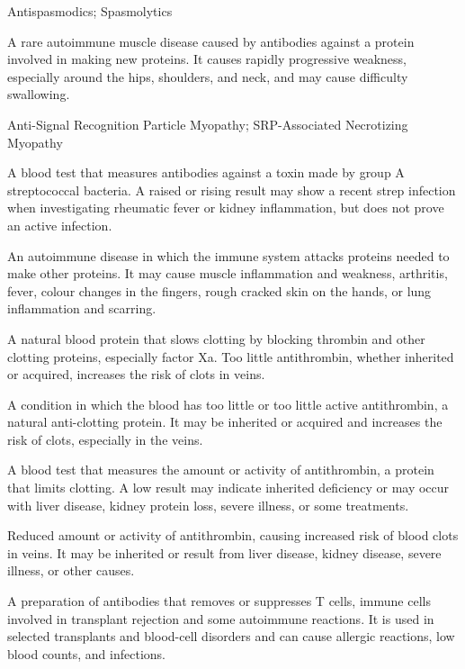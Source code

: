 \synonyms
Antispasmodics; Spasmolytics

 A rare autoimmune muscle disease caused by antibodies against a protein involved in making new proteins. It causes rapidly progressive weakness, especially around the hips, shoulders, and neck, and may cause difficulty swallowing.

\synonyms
Anti-Signal Recognition Particle Myopathy; SRP-Associated Necrotizing Myopathy

 A blood test that measures antibodies against a toxin made by group A streptococcal bacteria. A raised or rising result may show a recent strep infection when investigating rheumatic fever or kidney inflammation, but does not prove an active infection.

 An autoimmune disease in which the immune system attacks proteins needed to make other proteins. It may cause muscle inflammation and weakness, arthritis, fever, colour changes in the fingers, rough cracked skin on the hands, or lung inflammation and scarring.

 A natural blood protein that slows clotting by blocking thrombin and other clotting proteins, especially factor Xa. Too little antithrombin, whether inherited or acquired, increases the risk of clots in veins.

 A condition in which the blood has too little or too little active antithrombin, a natural anti-clotting protein. It may be inherited or acquired and increases the risk of clots, especially in the veins.

 A blood test that measures the amount or activity of antithrombin, a protein that limits clotting. A low result may indicate inherited deficiency or may occur with liver disease, kidney protein loss, severe illness, or some treatments.

 Reduced amount or activity of antithrombin, causing increased risk of blood clots in veins. It may be inherited or result from liver disease, kidney disease, severe illness, or other causes.

 A preparation of antibodies that removes or suppresses T cells, immune cells involved in transplant rejection and some autoimmune reactions. It is used in selected transplants and blood-cell disorders and can cause allergic reactions, low blood counts, and infections.

